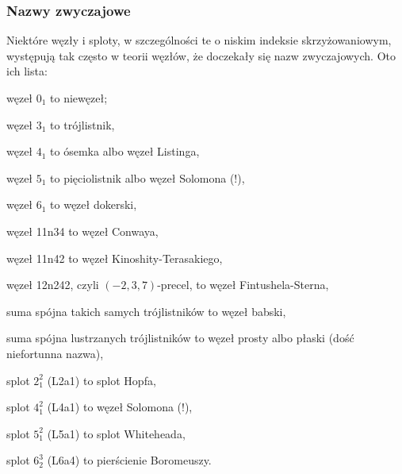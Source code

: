 \subsubsection{Nazwy zwyczajowe}
Niektóre węzły i sploty, w szczególności te o niskim indeksie skrzyżowaniowym, występują tak często w teorii węzłów, że doczekały się nazw zwyczajowych.
Oto ich lista:
\begin{compactitem}
    \item węzeł $0_1$ to niewęzeł;
    \item węzeł $3_1$ to trójlistnik,
    \item węzeł $4_1$ to ósemka albo węzeł Listinga,
    \item węzeł $5_1$ to pięciolistnik albo węzeł Solomona (!),
    \item węzeł $6_1$ to węzeł dokerski,
    \item węzeł 11n34 to węzeł Conwaya,
    \item węzeł 11n42 to węzeł Kinoshity-Terasakiego,
    \item węzeł 12n242, czyli $(-2, 3, 7)$-precel, to węzeł Fintushela-Sterna,
    \item suma spójna takich samych trójlistników to węzeł babski,
    \item suma spójna lustrzanych trójlistników to węzeł prosty albo płaski (dość niefortunna nazwa),
    \item splot $2_1^2$ (L2a1) to splot Hopfa,
    \item splot $4_1^2$ (L4a1) to węzeł Solomona (!),
    \item splot $5_1^2$ (L5a1) to splot Whiteheada,
    \item splot $6_2^3$ (L6a4) to pierścienie Boromeuszy.
\end{compactitem}

